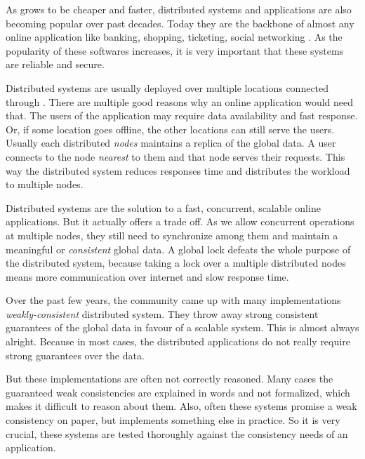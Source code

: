 


As \internet{} grows to be cheaper and faster, distributed systems and applications are also becoming popular over past decades.
Today they are the backbone of almost any online application like banking, shopping, ticketing, social networking \etc{}.
As the popularity of these softwares increases, it is very important that these systems are reliable and secure.


Distributed systems are usually deployed over multiple locations connected through \internet{}.
There are multiple good reasons why an online application would need that.
The users of the application may require data availability and fast response.
Or, if some location goes offline, the other locations can still serve the users.
Usually each distributed \emph{nodes} maintains a replica of the global data.
A user connects to the node \emph{nearest} to them and that node serves their requests.
This way the distributed system reduces responses time and distributes the workload to multiple nodes. 

Distributed systems are the solution to a fast, concurrent, scalable online applications. But it actually offers a trade off.
As we allow concurrent operations at multiple nodes, they still need to synchronize among them and maintain a meaningful or \emph{consistent} global data.
A global lock defeats the whole purpose of the distributed system, because taking a lock over a multiple distributed nodes means more communication over internet and slow response time.

Over the past few years, the community came up with many implementations \emph{weakly-consistent} distributed system.
They throw away strong consistent guarantees of the global data in favour of a scalable system.
This is almost always alright. Because in most cases, the distributed applications do not really require strong guarantees over the data.

But these implementations are often not correctly reasoned.
Many cases the guaranteed weak consistencies are explained in words and not formalized, which makes it difficult to reason about them.
Also, often these systems promise a weak consistency on paper, but implements something else in practice.
So it is very crucial, these systems are tested thoroughly against the consistency needs of an application.

